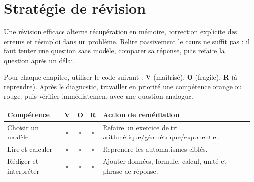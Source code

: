 
\section{Stratégie de révision}
\begin{keypoint}
Une révision efficace alterne récupération en mémoire, correction explicite des erreurs et réemploi dans un problème. Relire passivement le cours ne suffit pas : il faut tenter une question sans modèle, comparer sa réponse, puis refaire la question après un délai.
\end{keypoint}

Pour chaque chapitre, utiliser le code suivant : \textbf{V} (maîtrisé), \textbf{O} (fragile), \textbf{R} (à reprendre). Après le diagnostic, travailler en priorité une compétence orange ou rouge, puis vérifier immédiatement avec une question analogue.

\begin{center}
\begin{tabularx}{.9\textwidth}{lcccX}
\toprule
Compétence & V & O & R & Action de remédiation \\
\midrule
Choisir un modèle & $\square$ & $\square$ & $\square$ & Refaire un exercice de tri arithmétique/géométrique/exponentiel.\\
Lire et calculer & $\square$ & $\square$ & $\square$ & Reprendre les automatismes ciblés.\\
Rédiger et interpréter & $\square$ & $\square$ & $\square$ & Ajouter données, formule, calcul, unité et phrase de réponse.\\
\bottomrule
\end{tabularx}
\end{center}

